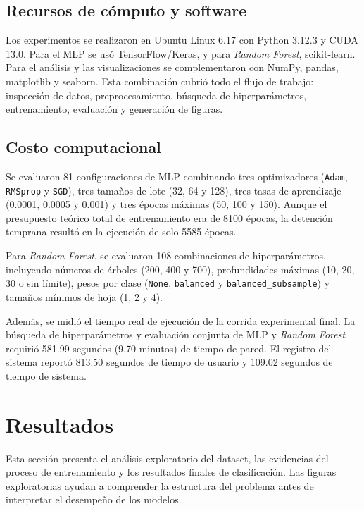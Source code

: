 \documentclass[conference]{IEEEtran}
\begin{document}
\subsection{Recursos de cómputo y software}

Los experimentos se realizaron en Ubuntu Linux 6.17 con Python 3.12.3 y CUDA 13.0. Para el MLP se usó TensorFlow/Keras, y para \textit{Random Forest}, scikit-learn. Para el análisis y las visualizaciones se complementaron con NumPy, pandas, matplotlib y seaborn. Esta combinación cubrió todo el flujo de trabajo: inspección de datos, preprocesamiento, búsqueda de hiperparámetros, entrenamiento, evaluación y generación de figuras.

\subsection{Costo computacional}

Se evaluaron 81 configuraciones de MLP combinando tres optimizadores (\texttt{Adam}, \texttt{RMSprop} y \texttt{SGD}), tres tamaños de lote (32, 64 y 128), tres tasas de aprendizaje (0.0001, 0.0005 y 0.001) y tres épocas máximas (50, 100 y 150). Aunque el presupuesto teórico total de entrenamiento era de 8100 épocas, la detención temprana resultó en la ejecución de solo 5585 épocas.

Para \textit{Random Forest}, se evaluaron 108 combinaciones de hiperparámetros, incluyendo números de árboles (200, 400 y 700), profundidades máximas (10, 20, 30 o sin límite), pesos por clase (\texttt{None}, \texttt{balanced} y \texttt{balanced\_subsample}) y tamaños mínimos de hoja (1, 2 y 4).

Además, se midió el tiempo real de ejecución de la corrida experimental final. La búsqueda de hiperparámetros y evaluación conjunta de MLP y \textit{Random Forest} requirió 581.99 segundos (9.70 minutos) de tiempo de pared. El registro del sistema reportó 813.50 segundos de tiempo de usuario y 109.02 segundos de tiempo de sistema.

\section{Resultados}\label{sec:resultados}

Esta sección presenta el análisis exploratorio del dataset, las evidencias del proceso de entrenamiento y los resultados finales de clasificación. Las figuras exploratorias ayudan a comprender la estructura del problema antes de interpretar el desempeño de los modelos.
\end{document}
